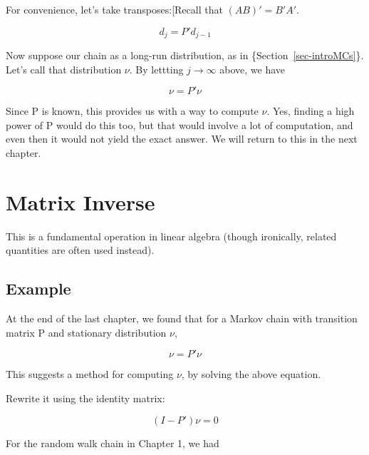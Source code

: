 \documentclass[
  letterpaper,
  DIV=11,
  numbers=noendperiod,
  oneside]{scrreprt}
\begin{document}
For convenience, let's take transposes:{[}Recall that \((AB)' = B'A'\).

\[
d_j = P' d_{j-1}
\]

Now suppose our chain as a long-run distribution, as in
\{Section~\ref{sec-introMCs}\}. Let's call that distribution \(\nu\). By
lettting \(j \rightarrow \infty\) above, we have

\[
\nu = P' \nu
\]

Since P is known, this provides us with a way to compute \(\nu\). Yes,
finding a high power of P would do this too, but that would involve a
lot of computation, and even then it would not yield the exact answer.
We will return to this in the next chapter.


\hypertarget{matrix-inverse}{%
\chapter{Matrix Inverse}\label{matrix-inverse}}

\newpage{}

This is a fundamental operation in linear algebra (though ironically,
related quantities are often used instead).

\hypertarget{example}{%
\section{Example}\label{example}}

At the end of the last chapter, we found that for a Markov chain with
transition matrix P and stationary distribution \(\nu\),

\[
\nu = P' \nu
\]

This suggests a method for computing \(\nu\), by solving the above
equation.{\marginnote{\begin{footnotesize}\end{footnotesize}}}

Rewrite it using the identity
matrix:{}

\[
(I - P') \nu = 0
\]

For the random walk chain in Chapter 1, we
had{}
\end{document}
